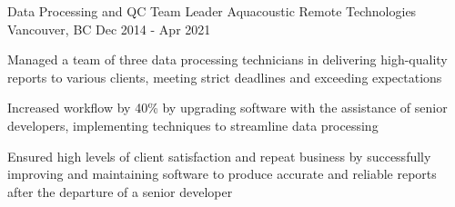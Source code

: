 \begin{cventries}
  \cventry
    {Data Processing and QC Team Leader} %
    {Aquacoustic Remote Technologies} %
    {Vancouver, BC} %
    {Dec 2014 - Apr 2021} %
    {
      \begin{cvitems} %
        \item{Managed a team of three data processing technicians in delivering high-quality reports to various clients, meeting strict deadlines and exceeding expectations}
        \item{Increased workflow by 40\% by upgrading software with the assistance of senior developers, implementing techniques to streamline data processing}
        \item{Ensured high levels of client satisfaction and repeat business by successfully improving and maintaining software to produce accurate and reliable reports after the departure of a senior developer}
      \end{cvitems}
    }

\end{cventries}
